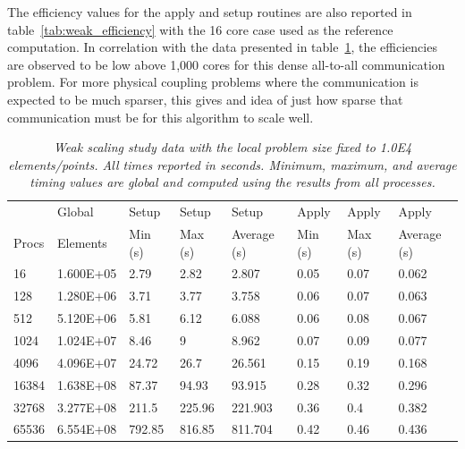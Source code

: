 \documentclass{mc2013}
\begin{document}
The efficiency values for the apply and setup routines are also
reported in table~\ref{tab:weak_efficiency} with the 16 core case used
as the reference computation. In correlation with the data presented
in table~\ref{tab:weak_scaling}, the efficiencies are observed to be
low above 1,000 cores for this dense all-to-all communication
problem. For more physical coupling problems where the communication
is expected to be much sparser, this gives and idea of just how sparse
that communication must be for this algorithm to scale well.

\begin{table}[htpb!]
  \begin{center}
    \begin{tabular}{llllllll}\hline\hline
      \multicolumn{1}{l}{} & 
      \multicolumn{1}{l}{Global} & 
      \multicolumn{1}{l}{Setup} & 
      \multicolumn{1}{l}{Setup} & 
      \multicolumn{1}{l}{Setup} & 
      \multicolumn{1}{l}{Apply} & 
      \multicolumn{1}{l}{Apply} & 
      \multicolumn{1}{l}{Apply}\\
      \multicolumn{1}{l}{Procs} & 
      \multicolumn{1}{l}{Elements} & 
      \multicolumn{1}{l}{Min (s)} & 
      \multicolumn{1}{l}{Max (s)} & 
      \multicolumn{1}{l}{Average (s)} & 
      \multicolumn{1}{l}{Min (s)} & 
      \multicolumn{1}{l}{Max (s)} & 
      \multicolumn{1}{l}{Average (s)}\\ \hline\hline
16 &	1.600E+05 & 2.79 &	2.82 &	  2.807 &	0.05 & 0.07 &	0.062 \\
128 &	1.280E+06 & 3.71 &	3.77 &	  3.758 &	0.06 &	0.07 &	0.063 \\
512 &	5.120E+06 & 5.81 &	6.12 &	  6.088 &	0.06 &	0.08 &	0.067 \\
1024 &	1.024E+07 & 8.46 &	9 &       8.962 &	0.07 &	0.09 &	0.077 \\
4096 &	4.096E+07 & 24.72 &	26.7 &	  26.561 &	0.15 &	0.19 &	0.168 \\
16384 &	1.638E+08 & 87.37 &	94.93 &	  93.915 &	0.28 &	0.32 &	0.296 \\
32768 &	3.277E+08 & 211.5 &	225.96 &  221.903 &	0.36 &	0.4 &	0.382 \\
65536 &	6.554E+08 & 792.85 & 816.85	& 811.704 &	0.42 &	0.46 &	0.436 \\
      \hline\hline
    \end{tabular}
  \end{center}
  \caption{\sl Weak scaling study data with the local problem size
    fixed to 1.0E4 elements/points. All times reported in
    seconds. Minimum, maximum, and average timing values are global
    and computed using the results from all processes.}
  \label{tab:weak_scaling}
\end{table}
\end{document}
